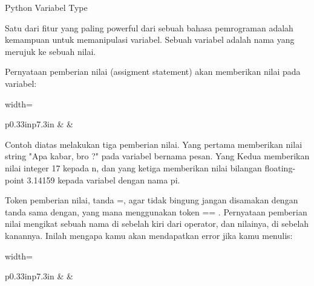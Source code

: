 \sloppy
Python Variabel Type  \par
\noindent 
Satu dari fitur yang paling powerful dari sebuah bahasa pemrograman adalah kemampuan untuk memanipulasi $  $variabel. Sebuah variabel adalah nama yang merujuk ke sebuah nilai. \par
\vspace{12pt}
\noindent 
Pernyataan pemberian nilai $  $(assigment statement) akan memberikan nilai pada variabel: \par
\vspace{12pt}




\begin{table}[H]
\centering
\begin{adjustbox}{width=\textwidth}
\begin{tabular}{ p{0.33in}p{7.3in} }
\hhline{--}
 &  & \hline
\end{tabular}
\end{adjustbox}
\end{table}




\vspace{12pt}
\noindent 
Contoh diatas melakukan tiga pemberian nilai. Yang pertama memberikan nilai string $  $"Apa kabar, bro ?" $  $pada variabel bernama $  $pesan. Yang Kedua memberikan nilai integer $  $17 $  $kepada $  $n, dan yang ketiga memberikan nilai bilangan floating-point $  $3.14159 $  $kepada variabel dengan nama $  $pi. \par
\vspace{12pt}
\noindent 
Token pemberian nilai, tanda $  $=, agar tidak bingung jangan disamakan dengan tanda $  $sama dengan, yang mana menggunakan token $  $== $  $. Pernyataan pemberian nilai mengikat sebuah $  $nama $  $di sebelah kiri dari operator, dan nilainya, di sebelah kanannya. Inilah mengapa kamu akan mendapatkan error jika kamu menulis: \par
\vspace{12pt}




\begin{table}[H]
\centering
\begin{adjustbox}{width=\textwidth}
\begin{tabular}{ p{0.33in}p{7.3in} }
\hhline{--}
 &  & \hline
\end{tabular}
\end{adjustbox}
\end{table}


